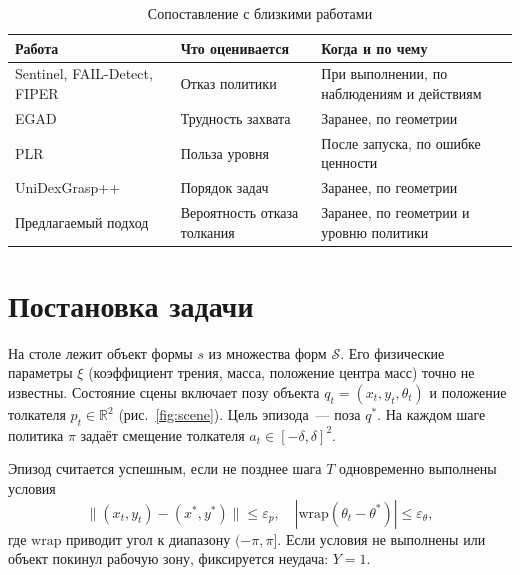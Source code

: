 \documentclass{misisarticle}
\begin{document}
\begin{table}[htbp]
  \caption{Сопоставление с близкими работами}
  \label{tab:related}
  \centering
  \small
  \begin{tabular}{>{\raggedright\arraybackslash}p{}>{\raggedright\arraybackslash}p{}>{\raggedright\arraybackslash}p{}}
    \toprule
    \textbf{Работа} & \textbf{Что оценивается} & \textbf{Когда и по чему} \\
    \midrule
    Sentinel, FAIL-Detect, FIPER~\cite{agia2024, xu2025, romer2025} & Отказ политики & При выполнении, по наблюдениям и действиям \\
    EGAD~\cite{morrison2020} & Трудность захвата & Заранее, по геометрии \\
    PLR~\cite{jiang2021} & Польза уровня & После запуска, по ошибке ценности \\
    UniDexGrasp++~\cite{wan2023} & Порядок задач & Заранее, по геометрии \\
    Предлагаемый подход & Вероятность отказа толкания & Заранее, по геометрии и уровню политики \\
    \bottomrule
  \end{tabular}
\end{table}

\section{Постановка задачи}

На столе лежит объект формы $s$ из множества форм $\mathcal{S}$. Его физические параметры $\xi$ (коэффициент трения, масса, положение центра масс) точно не известны. Состояние сцены включает позу объекта $q_t = (x_t, y_t, \theta_t)$ и положение толкателя $p_t \in \mathbb{R}^2$ (рис.~\ref{fig:scene}). Цель эпизода~--- поза $q^{*}$. На каждом шаге политика $\pi$ задаёт смещение толкателя $a_t \in [-\delta, \delta]^2$.

Эпизод считается успешным, если не позднее шага $T$ одновременно выполнены условия
\begin{equation}
  \|(x_t, y_t) - (x^{*}, y^{*})\| \le \varepsilon_p, \quad
  |\mathrm{wrap}(\theta_t - \theta^{*})| \le \varepsilon_\theta,
  \label{eq:success}
\end{equation}
где $\mathrm{wrap}$ приводит угол к диапазону $(-\pi, \pi]$. Если условия не выполнены или объект покинул рабочую зону, фиксируется неудача: $Y = 1$.
\end{document}
